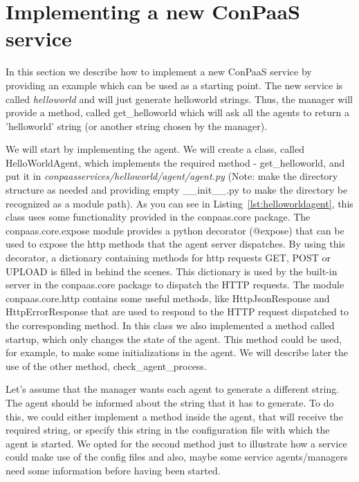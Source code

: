 \documentclass[10pt]{article}
\newcommand{\ConPaaSHOME}{..}
\begin{document}
\section{Implementing a new ConPaaS service}

In this section we describe how to implement a new ConPaaS service by providing an example which can be used as a starting point. The new service is called \textit{helloworld} and will just generate helloworld strings. Thus, the manager will provide a method, called get\_helloworld which will ask all the agents to return a 'helloworld' string (or another string chosen by the manager). 

We will start by implementing the agent. We will create a class, called HelloWorldAgent, which implements the required method - get\_helloworld, and put it in \textit{conpaasservices/helloworld/agent/agent.py} (Note: make the directory structure as needed and providing empty \_\_init\_\_.py to make the directory be recognized as a module path). As you can see in Listing~\ref{lst:helloworldagent}, this class uses some functionality provided in the conpaas.core package. The conpaas.core.expose module provides a python decorator (@expose) that can be used to expose the http methods that the agent server dispatches. By using this decorator, a dictionary containing methods for http requests GET, POST or UPLOAD is filled in behind the scenes. This dictionary is used by the built-in server in the conpaas.core package to dispatch the HTTP requests. The module conpaas.core.http contains some useful methods, like HttpJsonResponse and HttpErrorResponse that are used to respond to the HTTP request dispatched to the corresponding method. In this class we also implemented a method called startup, which only changes the state of the agent. This method could be used, for example, to make some initializations in the agent. We will describe later the use of the other method, check\_agent\_process.



Let's assume that the manager wants each agent to generate a different string. The agent should be informed about the string that it has to generate. To do this, we could either implement a method inside the agent, that will receive the required string, or specify this string in the configuration file with which the agent is started. We opted for the second method just to illustrate how a service could make use of the config files and also, maybe some service agents/managers need some information before having been started.
\end{document}

